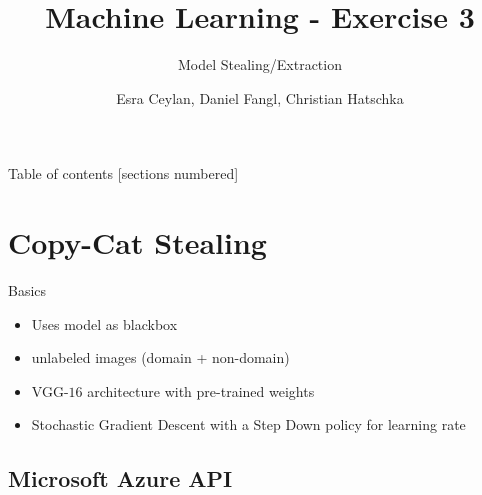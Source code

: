 \documentclass[10pt]{beamer}
\title{Machine Learning - Exercise 3}
\subtitle{Model Stealing/Extraction}
\date{}
\author{Esra Ceylan, Daniel Fangl, Christian Hatschka}
\institute{TU Wien}
\begin{document}
\maketitle
\begin{frame}{Table of contents}
  [sections numbered]
  \tableofcontents%
\end{frame}
\section[Copy-Cat Stealing]{Copy-Cat Stealing}
\begin{frame}[fragile]{Basics}
\begin{itemize}
    \item Uses model as blackbox
    \item unlabeled images (domain + non-domain)
    \item VGG-$16$ architecture with pre-trained weights
    \item Stochastic Gradient Descent with a Step Down policy for learning rate
\end{itemize}
\end{frame}
\subsection[Microsoft Azure API]{Microsoft Azure API}
\end{document}

